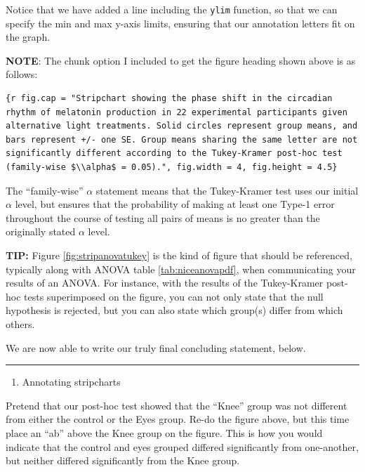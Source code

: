 \documentclass[
]{book}
\providecommand{\tightlist}{%
  \setlength{\itemsep}{0pt}\setlength{\parskip}{0pt}}
\begin{document}
Notice that we have added a line including the \texttt{ylim} function, so that we can specify the min and max y-axis limits, ensuring that our annotation letters fit on the graph.

\textbf{NOTE}: The chunk option I included to get the figure heading shown above is as follows:

\begin{verbatim}
{r fig.cap = "Stripchart showing the phase shift in the circadian rhythm of melatonin production in 22 experimental participants given alternative light treatments. Solid circles represent group means, and bars represent +/- one SE. Group means sharing the same letter are not significantly different according to the Tukey-Kramer post-hoc test (family-wise $\\alpha$ = 0.05).", fig.width = 4, fig.height = 4.5}
\end{verbatim}

The ``family-wise'' \(\alpha\) statement means that the Tukey-Kramer test uses our initial \(\alpha\) level, but ensures that the probability of making at least one Type-1 error throughout the course of testing all pairs of means is no greater than the originally stated \(\alpha\) level.

\textbf{TIP:}
Figure \ref{fig:stripanovatukey} is the kind of figure that should be referenced, typically along with ANOVA table \ref{tab:niceanovapdf}, when communicating your results of an ANOVA. For instance, with the results of the Tukey-Kramer post-hoc tests superimposed on the figure, you can not only state that the null hypothesis is rejected, but you can also state which group(s) differ from which others.

We are now able to write our truly final concluding statement, below.

\begin{center}\rule{0.5\linewidth}{0.5pt}\end{center}

\begin{enumerate}
\def\labelenumi{\arabic{enumi}.}
\tightlist
\item
  Annotating stripcharts
\end{enumerate}

Pretend that our post-hoc test showed that the ``Knee'' group was not different from either the control or the Eyes group. Re-do the figure above, but this time place an ``ab'' above the Knee group on the figure. This is how you would indicate that the control and eyes grouped differed significantly from one-another, but neither differed significantly from the Knee group.
\end{document}
